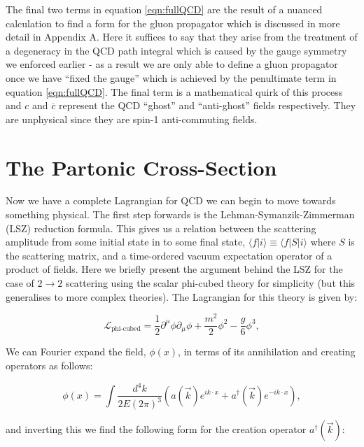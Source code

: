 	The final two terms in equation \eqref{eqn:fullQCD} are the result of a nuanced calculation to find a form
	for the gluon propagator which is discussed in more detail in Appendix A.  Here it suffices to say that they
	arise from the treatment of a degeneracy in the QCD path integral which is caused by the gauge symmetry we
	enforced earlier - as a result we are only able to define a gluon propagator once we have ``fixed the gauge'' which
	is achieved by the penultimate term in equation \eqref{eqn:fullQCD}.  The final term is a
	mathematical quirk of this process and $c$ and $\overline{c}$ represent the QCD
	``ghost'' and ``anti-ghost'' fields respectively.  They are unphysical since they are spin-1 anti-commuting fields.

\section{The Partonic Cross-Section}
	\label{sec:partonicCrossSection}

	Now we have a complete Lagrangian for QCD we can begin to move towards something physical.  The first step forwards
	is the Lehman-Symanzik-Zimmerman (LSZ) reduction formula.  This gives us a relation between the scattering amplitude
	from some initial state in to some final state, $\langle f|i\rangle\equiv\langle f|S|i\rangle$ where $S$ is the
	scattering matrix, and a time-ordered vacuum expectation operator of a product of fields.  Here we briefly present
	the argument behind the LSZ for the case of $2\rightarrow2$ scattering using the scalar phi-cubed theory for simplicity
	(but this generalises to more complex theories). The Lagrangian for this theory is given by:

	\begin{equation}
		\mathcal{L}_{\text{phi-cubed}} = \frac{1}{2}\partial^{\mu}\phi\partial_{\mu}\phi + \frac{m^2}{2}\phi^2 - \frac{g}{6}\phi^3,
		\label{eqn:phi3}
	\end{equation}

	We can Fourier expand the field, $\phi(x)$, in terms of its annihilation and creating operators as follows:

	\begin{equation}
		\phi(x) = \int\frac{d^4k}{2E(2\pi)^3}\left(a(\vec{k})e^{ik\cdot x} + a^\dagger(\vec{k})e^{-ik\cdot x}\right),
	\end{equation}

	and inverting this we find the following form for the creation operator $a^\dagger(\vec{k})$:

